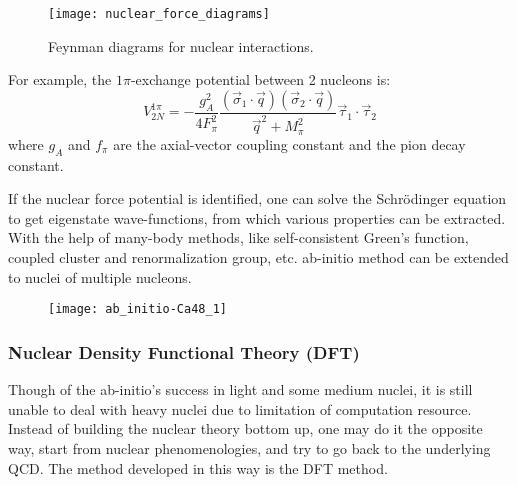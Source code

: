 \begin{figure}
    \centering
    \texttt{[image: nuclear\_force\_diagrams]}
    \caption{Feynman diagrams for nuclear interactions.}
\end{figure}

For example, the $1\pi$-exchange potential between 2 nucleons is:
\begin{equation}
    V_{2N}^{1\pi} = -\frac{g_A^2}{4F_\pi^2}
    \frac{(\vec{\sigma}_1\cdot\vec{q})(\vec{\sigma}_2\cdot\vec{q})}{\vec{q}^2 + M^2_\pi}
    \vec{\tau}_1\cdot\vec{\tau}_2 
\end{equation}
where $g_A$ and $f_\pi$ are the axial-vector coupling constant and the pion 
decay constant.

If the nuclear force potential is identified, one can solve the Schr\"{o}dinger 
equation to get eigenstate wave-functions, from which various properties can be extracted. 
With the help of many-body methods, like self-consistent Green's function,
coupled cluster and renormalization group, etc. ab-initio method can be extended
to nuclei of multiple nucleons.

\begin{figure}
    \centering
    \texttt{[image: ab\_initio-Ca48\_1]}
\end{figure}

\begin{comment}
Deviation of ab-initio result and observation for heavy nuclei indicates the 
importance of higher-order interactions.

\begin{equation}
    \CL_{eff} = \CL_{\pi\pi} + \CL_{\pi N} + \CL_{NN} + \cdots
\end{equation}

3-neutron forces are hard to observe directly, they increase the pressure of
neutron matter and therefore the neutron skin thickness of both \Pb and \Ca.

3-nucleon force term
\begin{itemize}
    \item Long-range two-pion exchange
    \item Medium-range one-pion exchange
    \item Short range three-nucleon contact
\end{itemize}
\end{comment}
\subsubsection{Nuclear Density Functional Theory (DFT)}
Though of the ab-initio's success in light and some medium nuclei, it is still 
unable to deal with heavy nuclei due to limitation of computation resource.
Instead of building the nuclear theory bottom up, one may do it the opposite
way, start from nuclear phenomenologies, and try to go back to the underlying
QCD. The method developed in this way is the DFT method.

